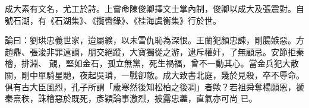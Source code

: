 \begin{pinyinscope}
 成大素有文名，尤工於詩。上嘗命陳俊卿擇文士掌內制，俊卿以成大及張震對。自號石湖，有《石湖集》、《攬轡錄》、《桂海虞衡集》行於世。



 論曰：劉珙忠義世家，迨屬纊，以未雪仇恥為深恨。王蘭犯顏忠諫，剛腸嫉惡。方趙鼎、張浚非罪遠謫，朋交絕蹤，大寶獨從之游，逮斥權奸，了無顧忌。安節拒秦檜，排淵、
 覿，堅如金石，孤立無黨，死生禍福，曾不一動其心。當金兵犯大散關，剛中單騎星馳，夜起吳璘，一戰卻敵。成大致書北庭，幾於見殺，卒不辱命。俱有古大臣風烈，孔子所謂「歲寒然後知松柏之後凋」者歟？若祖舜奪楊願恩，褫秦熹秩，誅檜惡於既死，彥穎論事激烈，披露忠藎，直氣亦可尚
 已。



\end{pinyinscope}